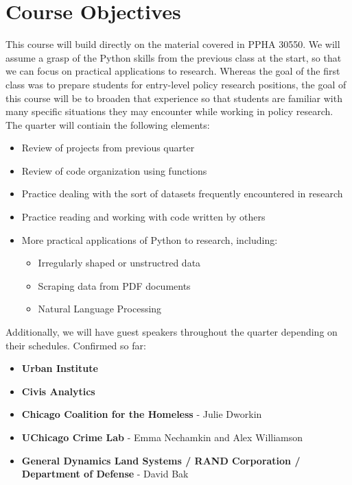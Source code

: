 \documentclass{article}
\begin{document}
\section*{Course Objectives}
This course will build directly on the material covered in PPHA 30550.  We will assume a grasp of the Python skills from the previous class at the start, so that we can focus on practical applications to research.  Whereas the goal of the first class was to prepare students for entry-level policy research positions, the goal of this course will be to broaden that experience so that students are familiar with many specific situations they may encounter while working in policy research.  The quarter will contiain the following elements:

\begin{itemize}
	\item Review of projects from previous quarter
	\item Review of code organization using functions
	\item Practice dealing with the sort of datasets frequently encountered in research
	\item Practice reading and working with code written by others
	\item More practical applications of Python to research, including:
	\begin{itemize}
		\item Irregularly shaped or unstructred data
		\item Scraping data from PDF documents
		\item Natural Language Processing
	\end{itemize}
\end{itemize}

\noindent Additionally, we will have guest speakers throughout the quarter depending on their schedules.  Confirmed so far:

\begin{itemize}
	\item \textbf{Urban Institute}
	\item \textbf{Civis Analytics}
	\item \textbf{Chicago Coalition for the Homeless} - Julie Dworkin
	\item \textbf{UChicago Crime Lab} - Emma Nechamkin and Alex Williamson
	\item \textbf{General Dynamics Land Systems / RAND Corporation / Department of Defense} - David Bak
\end{itemize}
\end{document}
